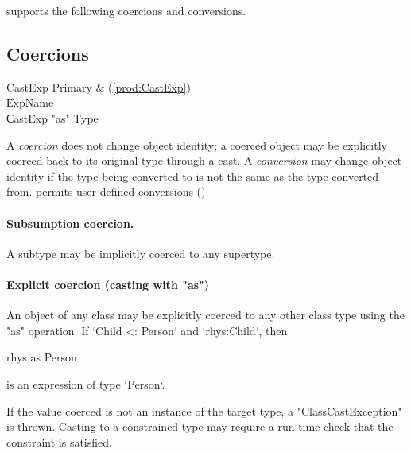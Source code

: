 \XtenCurrVer{} supports the following coercions and conversions.

\subsection{Coercions}

\begin{bbgrammar}
             CastExp \: Primary & (\ref{prod:CastExp}) \\
                    \| ExpName \\
                    \| CastExp \xcd"as" Type \\
\end{bbgrammar}


A {\em coercion} does not change object identity; a coerced object may
be explicitly coerced back to its original type through a cast. A {\em
  conversion} may change object identity if the type being converted
to is not the same as the type converted from. \Xten{} permits
user-defined conversions ().

\paragraph{Subsumption coercion.}
A subtype may be implicitly coerced to any supertype.

\paragraph{Explicit coercion (casting with \xcd"as")}



An object of any class may be explicitly coerced to any other
class type using the \xcd"as" operation.  If \xcd`Child <: Person` and
\xcd`rhys:Child`, then 
\begin{xten}
  rhys as Person
\end{xten}
is an expression of type \xcd`Person`.  

If the value coerced is not an instance of the target type,
a \xcd"ClassCastException" is thrown.  Casting to a constrained
type may require a run-time check that the constraint is
satisfied.


